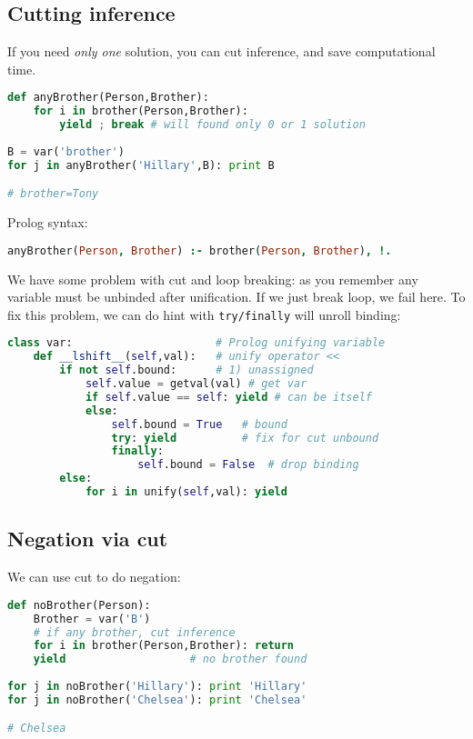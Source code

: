 \subsection{Cutting inference}

If you need \emph{only one} solution, you can cut inference, and save
computational time.

\begin{lstlisting}[language=Python]
def anyBrother(Person,Brother):
	for i in brother(Person,Brother):
		yield ; break # will found only 0 or 1 solution
	
B = var('brother')
for j in anyBrother('Hillary',B): print B

# brother=Tony
\end{lstlisting}
Prolog syntax:
\begin{lstlisting}[language=Prolog]
anyBrother(Person, Brother) :- brother(Person, Brother), !.
\end{lstlisting}

We have some problem with cut and loop breaking: as you remember any variable
must be unbinded after unification. If we just break loop, we fail here. To fix
this problem, we can do hint with \verb|try/finally| will unroll binding:
\begin{lstlisting}[language=Python]
class var:						# Prolog unifying variable
	def __lshift__(self,val):   # unify operator <<
		if not self.bound:		# 1) unassigned
			self.value = getval(val) # get var
			if self.value == self: yield # can be itself
			else:
				self.bound = True	# bound
				try: yield			# fix for cut unbound
				finally:
					self.bound = False	# drop binding
		else:
			for i in unify(self,val): yield
\end{lstlisting}


\clearpage
\subsection{Negation via cut}

We can use cut to do negation:
\begin{lstlisting}[language=Python]
def noBrother(Person):
	Brother = var('B')
	# if any brother, cut inference
	for i in brother(Person,Brother): return 
	yield					# no brother found							  
	
for j in noBrother('Hillary'): print 'Hillary'
for j in noBrother('Chelsea'): print 'Chelsea'

# Chelsea
\end{lstlisting}
